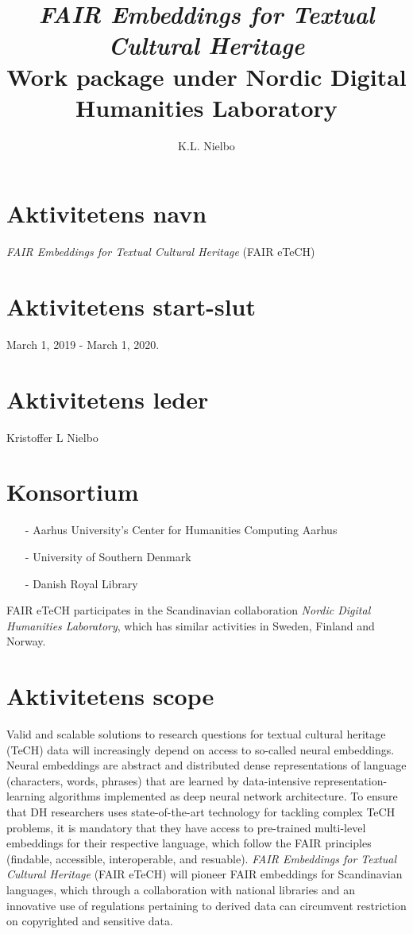 \documentclass[12pt,a4paper]{article}
\title{\emph{FAIR Embeddings for Textual Cultural Heritage}\\Work package under Nordic Digital Humanities Laboratory}%
\author{K.L. Nielbo}
\begin{document}
\section*{Aktivitetens navn}
\emph{FAIR Embeddings for Textual Cultural Heritage} (FAIR eTeCH)

\section*{Aktivitetens start-slut}
March 1, 2019 - March 1, 2020.
\section*{Aktivitetens leder}
Kristoffer L Nielbo
\section*{Konsortium}
\begin{itemize}
	\item[-] Aarhus University's Center for Humanities Computing Aarhus
	\item[-] University of Southern Denmark
	\item[-] Danish Royal Library
\end{itemize}

FAIR eTeCH participates in the Scandinavian collaboration \emph{Nordic Digital Humanities Laboratory}, which has similar activities in Sweden, Finland and Norway.

\section*{Aktivitetens scope}
Valid and scalable solutions to research questions for textual cultural heritage (TeCH) data will increasingly depend on access to so-called neural embeddings. Neural embeddings are abstract and distributed dense representations of language (characters, words, phrases) that are learned by data-intensive representation-learning algorithms implemented as deep neural network architecture. To ensure that DH researchers uses state-of-the-art technology for tackling complex TeCH problems, it is mandatory that they have access to pre-trained multi-level embeddings for their respective language, which follow the FAIR principles (findable, accessible, interoperable, and resuable). \emph{FAIR Embeddings for Textual Cultural Heritage} (FAIR eTeCH) will pioneer FAIR embeddings for Scandinavian languages, which through a collaboration with national libraries and an innovative use of regulations pertaining to derived data can circumvent restriction on copyrighted and sensitive data.
\end{document}
